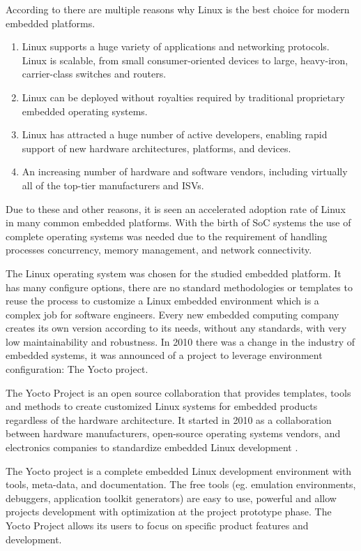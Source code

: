 According to \cite{Hallinan} there are multiple reasons why Linux is the best
choice for modern embedded platforms.

\begin{enumerate}
\item Linux supports a huge variety of applications and networking protocols.
Linux is scalable, from small consumer-oriented devices to large, heavy-iron,
carrier-class switches and routers.
\item Linux can be deployed without royalties required by traditional proprietary
embedded operating systems.
\item Linux has attracted a huge number of active developers, enabling rapid support
of new hardware architectures, platforms, and devices.
\item An increasing number of hardware and software vendors, including virtually all
of the top-tier manufacturers and ISVs.
\end{enumerate}

Due to these and other reasons, it is seen an accelerated adoption rate of
Linux in many common embedded platforms. With the birth of SoC systems the
use of complete operating systems was needed due to the requirement of handling
processes concurrency, memory management, and network connectivity.

The Linux operating system was chosen for the studied embedded platform.
It has many configure options, there are no standard
methodologies or templates to reuse the process to customize a Linux
embedded environment which is a complex job for software engineers.
Every new embedded computing company creates its own version according to its
needs, without any standards, with very low maintainability and robustness. In 2010
there was a change in the industry of embedded systems, it was announced of a
project to leverage environment configuration: The Yocto project.

The Yocto Project is an open source collaboration that provides
templates, tools and methods to create customized Linux systems for
embedded products regardless of the hardware architecture\cite{yocto-project}.
It started in 2010 as a collaboration between hardware manufacturers,
open-source operating systems vendors, and electronics companies to standardize 
embedded Linux development \cite{Leppakoski}.

The Yocto project  is a  complete embedded Linux development environment with
tools, meta-data, and documentation. The free tools (eg. emulation
environments, debuggers, application toolkit generators) are easy to use,
powerful and allow projects development with optimization at the project
prototype phase. The Yocto Project allows its users to focus on
specific product features and development.


